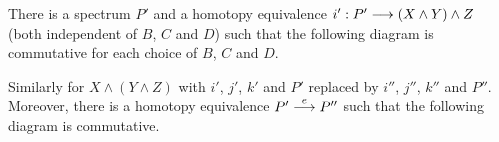 \documentclass[../main]{subfiles}
\begin{document}
\begin{lemma}
\label{lem:p3c04.7}
There is a spectrum $P'$ and a homotopy equivalence $i' : P' \overset{}{\longrightarrow} (X \wedge Y) \wedge Z$ (both independent of $B$, $C$ and $D$) such that the following diagram is commutative for each choice of $B$, $C$ and $D$. 

 {
}

Similarly for $X \wedge (Y \wedge Z)$ with $i'$, $j'$, $k'$ and $P'$ replaced by $i''$, $j''$, $k''$ and $P''$. Moreover, there is a homotopy equivalence $P' \overset{e}{\longrightarrow} P''$ such that the following diagram is commutative. 

\begin{center}
\end{center}
\end{lemma}
\end{document}
